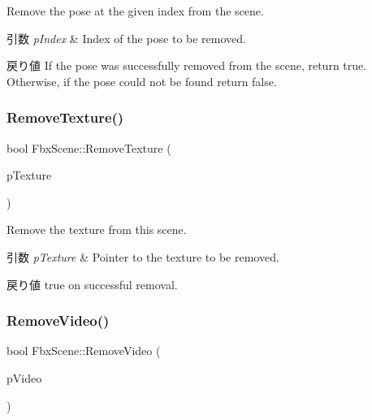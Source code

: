 Remove the pose at the given index from the scene. 
\begin{DoxyParams}{引数}
{\em p\+Index} & Index of the pose to be removed. \\
\hline
\end{DoxyParams}
\begin{DoxyReturn}{戻り値}
If the pose was successfully removed from the scene, return {\ttfamily true}. Otherwise, if the pose could not be found return {\ttfamily false}. 
\end{DoxyReturn}
\mbox{\label{class_fbx_scene_af802f5395ba0fcb72f13f2734ad17332}} 
\subsubsection{\texorpdfstring{Remove\+Texture()}{RemoveTexture()}}
{\footnotesize\ttfamily bool Fbx\+Scene\+::\+Remove\+Texture (\begin{DoxyParamCaption}\item[{\hyperlink{class_fbx_texture}{Fbx\+Texture} $\ast$}]{p\+Texture }\end{DoxyParamCaption})}

Remove the texture from this scene. 
\begin{DoxyParams}{引数}
{\em p\+Texture} & Pointer to the texture to be removed. \\
\hline
\end{DoxyParams}
\begin{DoxyReturn}{戻り値}
{\ttfamily true} on successful removal. 
\end{DoxyReturn}
\mbox{\label{class_fbx_scene_aac60d3534072390ae951879dd92339ff}} 
\subsubsection{\texorpdfstring{Remove\+Video()}{RemoveVideo()}}
{\footnotesize\ttfamily bool Fbx\+Scene\+::\+Remove\+Video (\begin{DoxyParamCaption}\item[{\hyperlink{class_fbx_video}{Fbx\+Video} $\ast$}]{p\+Video }\end{DoxyParamCaption})}

